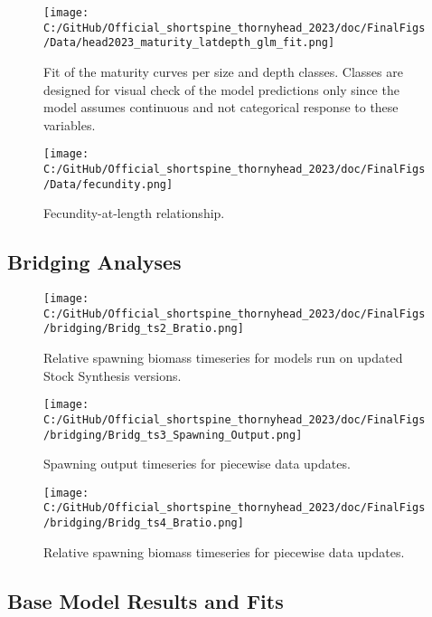 \documentclass[11pt,
  letterpaper,
]{article}
\begin{document}
\begin{figure}
\centering
\texttt{[image: C:/GitHub/Official\_shortspine\_thornyhead\_2023/doc/FinalFigs/Data/head2023\_maturity\_latdepth\_glm\_fit.png]}
\caption{Fit of the maturity curves per size and depth classes. Classes are designed for visual check of the model predictions only since the model assumes continuous and not categorical response to these variables.\label{fig:mat1}}
\end{figure}

\begin{figure}
\centering
\texttt{[image: C:/GitHub/Official\_shortspine\_thornyhead\_2023/doc/FinalFigs/Data/fecundity.png]}
\caption{Fecundity-at-length relationship.\label{fig:fec}}
\end{figure}

\clearpage

\hypertarget{bridging-analyses}{%
\subsection{Bridging Analyses}\label{bridging-analyses}}

\begin{figure}
\centering
\texttt{[image: C:/GitHub/Official\_shortspine\_thornyhead\_2023/doc/FinalFigs/bridging/Bridg\_ts2\_Bratio.png]}
\caption{Relative spawning biomass timeseries for models run on updated Stock Synthesis versions.\label{fig:bridge_bratio}}
\end{figure}

\begin{figure}
\centering
\texttt{[image: C:/GitHub/Official\_shortspine\_thornyhead\_2023/doc/FinalFigs/bridging/Bridg\_ts3\_Spawning\_Output.png]}
\caption{Spawning output timeseries for piecewise data updates.\label{fig:bridge_spawnout_data}}
\end{figure}

\begin{figure}
\centering
\texttt{[image: C:/GitHub/Official\_shortspine\_thornyhead\_2023/doc/FinalFigs/bridging/Bridg\_ts4\_Bratio.png]}
\caption{Relative spawning biomass timeseries for piecewise data updates.\label{fig:bridge_bratio_data}}
\end{figure}

\clearpage

\hypertarget{base-model-results-and-fits}{%
\subsection{Base Model Results and Fits}\label{base-model-results-and-fits}}
\end{document}
